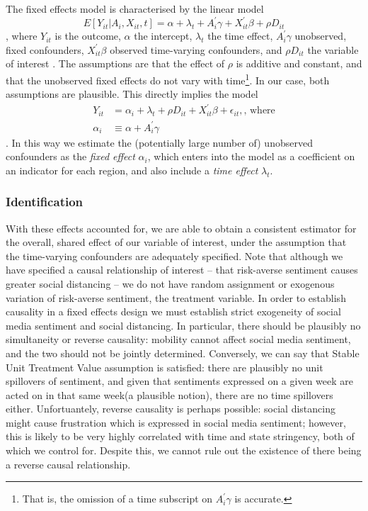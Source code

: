 \documentclass{article}
\begin{document}
The fixed effects model is characterised by the linear model  
\begin{equation}
  E[Y_{it} | A_i , X_{it}, t] = \alpha + \lambda_t + A^\prime_i \gamma + X^\prime_{it} \beta + \rho D_{it}
\end{equation}
, where \(Y_{it}\) is the outcome, \(\alpha\) the intercept, \(\lambda_t\) the time effect, \(A^\prime_i \gamma\) unobserved, fixed confounders, \(X^\prime_{it} \beta\) observed time-varying confounders, and \(\rho D_{it}\) the variable of interest \parencite[222]{angristMostlyHarmlessEconometrics2009a}. The assumptions are that the effect of \(\rho\) is additive and constant, and that the unobserved fixed effects do not vary with time\footnote{That is, the omission of a time subscript on \(A^\prime_i \gamma\) is accurate.}. In our case, both assumptions are plausible. This directly implies the model 
\begin{align}
  Y_{it} &= \alpha_i + \lambda_t + \rho D_{it} + X^\prime_{it} \beta + \epsilon_{it}, \textrm{, where} \\
  \alpha_i &\equiv \alpha + A_i^\prime \gamma
\end{align}. In this way we estimate the (potentially large number of) unobserved confounders as the \textit{fixed effect} \(\alpha_i\), which enters into the model as a coefficient on an indicator for each region, and also include a \textit{time effect} \(\lambda_t\). 
\subsubsection{Identification}
With these effects accounted for, we are able to obtain a consistent estimator for the overall, shared effect of our variable of interest, under the assumption that the time-varying confounders are adequately specified. Note that although we have specified a causal relationship of interest -- that risk-averse sentiment causes greater social distancing -- we do not have random assignment or exogenous variation of risk-averse sentiment, the treatment variable. In order to establish causality in a fixed effects design we must establish strict exogeneity of social media sentiment and social distancing. In particular, there should be plausibly no simultaneity or reverse causality: mobility cannot affect social media sentiment, and the two should not be jointly determined. Conversely, we can say that Stable Unit Treatment Value assumption is satisfied: there are plausibly no unit spillovers of sentiment, and given that sentiments expressed on a given week are acted on in that same week(a plausible notion), there are no time spillovers either.  Unfortuantely, reverse causality is perhaps possible: social distancing might cause frustration which is expressed in social media sentiment; however, this is likely to be very highly correlated with time and state stringency, both of which we control for. Despite this, we cannot rule out the existence of there being a reverse causal relationship. 
\end{document}
